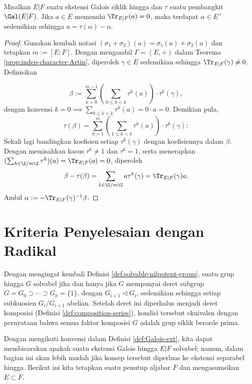 \begin{theorem}\label{prop:Hilbert-90-additive}
	Misalkan $E|F$ suatu ekstensi Galois siklik hingga dan $\tau$ suatu pembangkit $\Gal(E|F)$. Jika $a \in E$ memenuhi $\Tr_{E|F}(a)=0$, maka terdapat $\alpha \in E^\times$ sedemikian sehingga $a = \tau(\alpha) - \alpha$.
\end{theorem}
\begin{proof}
	Gunakan kembali notasi $(\sigma_1 +\sigma_2)(a) = \sigma_1(a) + \sigma_2(a)$ dan tetapkan $m := [E:F]$. Dengan mengambil $\Gamma = (E, +)$ dalam Teorema \ref{prop:indep-character-Artin}, diperoleh $\gamma \in E$ sedemikian sehingga $\Tr_{E|F}(\gamma) \neq 0$. Definisikan

	\[ \beta := \sum_{k=0}^{m-1} \left( \sum_{0 \leq h < k} \tau^h(a) \right) \cdot \tau^k(\gamma), \]
	dengan konvensi $k=0 \implies \sum_{0 \leq h < k} \tau^h(a) = 0 \cdot a = 0$. Demikian pula,
	\[ \tau(\beta) = \sum_{k=1}^m \left( \sum_{1 \leq h < k} \tau^h(a) \right) \cdot \tau^k(\gamma); \]
	Sekali lagi bandingkan koefisien setiap $\tau^k(\gamma)$ dengan koefisiennya dalam $\beta$. Dengan memisahkan kasus $\tau^k \neq 1$ dan $\tau^k=1$, serta menerapkan $(\sum_{h \in \Z/m\Z} \tau^h)(a) = \Tr_{E|F}(a) = 0$, diperoleh
	\[ \beta - \tau(\beta) = \sum_{k \in \Z/m\Z} a \tau^k(\gamma) = \Tr_{E|F}(\gamma) a. \]
	Ambil $\alpha := -\Tr_{E|F}(\gamma)^{-1} \beta$.
\end{proof}

\section{Kriteria Penyelesaian dengan Radikal}\label{sec:solvability-radicals}
Dengan mengingat kembali Definisi \ref{def:solvable-nilpotent-group}, suatu grup hingga $G$ solvabel jika dan hanya jika $G$ mempunyai deret subgrup $G = G_0 \supset \cdots \supset G_k = \{1\}$, dengan $G_{i+1} \lhd G_i$, sedemikian sehingga setiap subkuosien $G_i/G_{i+1}$ abelian. Setelah deret ini diperhalus menjadi deret komposisi (Definisi \ref{def:composition-series}), kondisi tersebut ekuivalen dengan pernyataan bahwa semua faktor komposisi $G$ adalah grup siklik berorde prima.

Dengan mengikuti konvensi dalam Definisi \ref{def:Galois-ext}, kita dapat membicarakan apakah suatu ekstensi Galois hingga $E|F$ solvabel; namun, dalam bagian ini akan lebih mudah jika konsep tersebut diperluas ke ekstensi separabel hingga. Berikut ini kita tetapkan suatu penutup aljabar $\overline{F}$ dan mengasumsikan $E \subset \overline{F}$.

